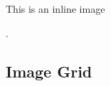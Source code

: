 \documentclass[letterpaper]{article}
\begin{document}
This is an inline image \begin{minipage}[b]{0.08\columnwidth}
    \centering
\end{minipage}.


\subsection{Image Grid}
\end{document}
